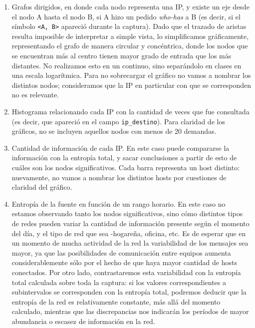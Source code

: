 \begin{enumerate}
 \item Grafos dirigidos, en donde cada nodo representa una IP, y existe un eje desde el nodo A hasta el nodo B, si A hizo un pedido \emph{who-has} a B (es decir, si el s\'imbolo \texttt{<A, B>} apareci\'o durante la captura). Dado que el trazado de aristas resulta imposible de interpretar a simple vista, lo simplificamos gráficamente, representando el grafo de manera circular y concéntrica, donde los nodos que se encuentran más al centro tienen mayor grado de entrada que los más distantes. No realizamos esto en un continuo, sino separándolo en clases en una escala logarítmica. Para no sobrecargar el gr\'afico no vamos a nombrar los distintos nodos;  consideramos que la IP en particular con que se corresponden no es relevante.
 
 \item Histograma relacionando cada IP con la cantidad de veces que fue consultada (es decir, que apareci\'o en el campo \texttt{ip\_destino}). Para claridad de los gr\'aficos, no se incluyen aquellos nodos con menos de 20 demandas.
 
 \item Cantidad de informaci\'on de cada IP. En este caso puede compararse la informaci\'on con la entrop\'ia total, y sacar conclusiones a partir de esto de cu\'ales son los nodos significativos. Cada barra representa un host distinto: nuevamente, no vamos a nombrar los distintos hosts por cuestiones de claridad del gr\'afico.
 
 \item Entrop\'ia de la fuente en funci\'on de un rango horario. En este caso no estamos observando tanto los nodos significativos, sino c\'omo distintos tipos de redes pueden variar la cantidad de informaci\'on presente seg\'un el momento del d\'ia, y el tipo de red que sea -hogare\~na, oficina, etc. Es de esperar que en un momento de mucha actividad de la red la variabilidad de los mensajes sea mayor, ya que las posibilidades de comunicación entre equipos aumenta considerablemente sólo por el hecho de que haya mayor cantidad de hosts conectados. Por otro lado, contrastaremos esta variabilidad con la entropía total calculada sobre toda la captura: si los valores correspondientes a subintervalos se corresponden con la entropía total, podremos deducir que la entropía de la red es relativamente constante, más allá del momento calculado, mientras que las discrepancias nos indicarán los períodos de mayor abundancia o escasez de información en la red.
 

\end{enumerate}
